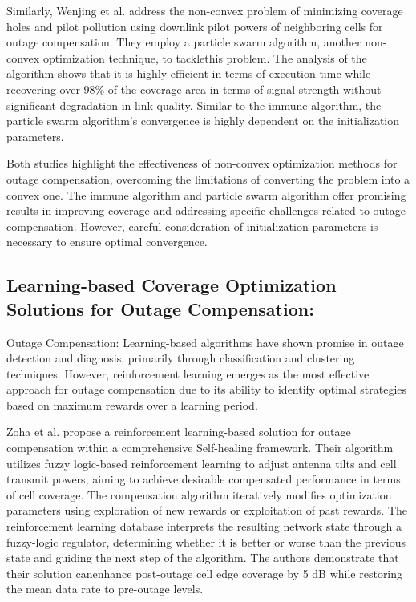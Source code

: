 Similarly, Wenjing et al. \cite{wenjing2012centralized} address the non-convex problem of minimizing coverage holes and pilot pollution using downlink pilot powers of neighboring cells for outage compensation. They employ a particle swarm algorithm, another non-convex optimization technique, to tacklethis problem. The analysis of the algorithm shows that it is highly efficient in terms of execution time while recovering over 98\% of the coverage area in terms of signal strength without significant degradation in link quality. Similar to the immune algorithm, the particle swarm algorithm's convergence is highly dependent on the initialization parameters.

Both studies highlight the effectiveness of non-convex optimization methods for outage compensation, overcoming the limitations of converting the problem into a convex one. The immune algorithm and particle swarm algorithm offer promising results in improving coverage and addressing specific challenges related to outage compensation. However, careful consideration of initialization parameters is necessary to ensure optimal convergence.

\subsection{Learning-based Coverage Optimization Solutions for Outage Compensation:}

Outage Compensation: Learning-based algorithms have shown promise in outage detection and diagnosis, primarily through classification and clustering techniques. However, reinforcement learning emerges as the most effective approach for outage compensation due to its ability to identify optimal strategies based on maximum rewards over a learning period.

Zoha et al. \cite{zoha2016learning} propose a reinforcement learning-based solution for outage compensation within a comprehensive Self-healing framework. Their algorithm utilizes fuzzy logic-based reinforcement learning to adjust antenna tilts and cell transmit powers, aiming to achieve desirable compensated performance in terms of cell coverage. The compensation algorithm iteratively modifies optimization parameters using exploration of new rewards or exploitation of past rewards. The reinforcement learning database interprets the resulting network state through a fuzzy-logic regulator, determining whether it is better or worse than the previous state and guiding the next step of the algorithm. The authors demonstrate that their solution canenhance post-outage cell edge coverage by 5 dB while restoring the mean data rate to pre-outage levels.

